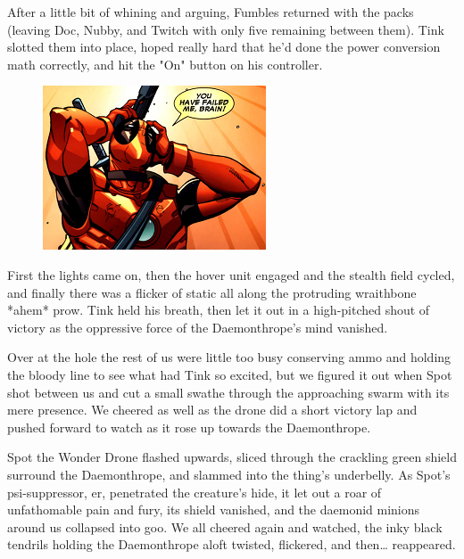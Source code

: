 After a little bit of whining and arguing, Fumbles returned with the packs (leaving Doc, Nubby, and Twitch with only five remaining between them). 
Tink slotted them into place, hoped really hard that he'd done the power conversion math correctly, and hit the "On" button on his controller.

\begin{figure}
	\begin{center}
		\includegraphics[width=\figwidth]{pics/16/42.png}
	\end{center}
\end{figure}
First the lights came on, then the hover unit engaged and the stealth field cycled, and finally there was a flicker of static all along the protruding wraithbone *ahem* prow. 
Tink held his breath, then let it out in a high-pitched shout of victory as the oppressive force of the Daemonthrope's mind vanished. 


Over at the hole the rest of us were  little too busy conserving ammo and holding the bloody line to see what had Tink so excited, but we figured it out when Spot shot between us and cut a small swathe through the approaching swarm with its mere presence. 
We cheered as well as the drone did a short victory lap and pushed forward to watch as it rose up towards the Daemonthrope.

Spot the Wonder Drone flashed upwards, sliced through the crackling green shield surround the Daemonthrope, and slammed into the thing's underbelly. 
As Spot's psi-suppressor, er, penetrated the creature's hide, it let out a roar of unfathomable pain and fury, its shield vanished, and the daemonid minions around us collapsed into goo. 
We all cheered again and watched, the inky black tendrils holding the Daemonthrope aloft twisted, flickered, and then… reappeared. 


